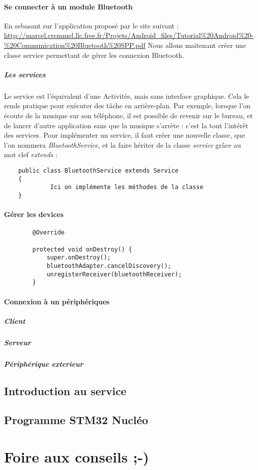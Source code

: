 \documentclass[a4paper,10pt]{article}
\begin{document}
	
	\paragraph{Se connecter à un module Bluetooth}
	
	En sebasant sur l'application proposé par le site suivant : \\
	\url{http://marcel.cremmel.llc.free.fr/Projets/Android_files/Tutorial%20Android%20-%20Communication%20Bluetooth%20SPP.pdf}
	Nous allons maitenant créer une classe service permettant de gérer les connexion Bluetooth.
	\subparagraph{Les services}
	Le service est l'équivalent d'une Activités, mais sans interface graphique. Cela le rends pratique pour exécuter des tâche en arrière-plan. Par exemple, lorsque l'on écoute de la musique sur son téléphone, il est possible de revenir sur le bureau, et de lancer d'autre application sans que la musique s'arrète : c'est la tout l'intérêt des services.
	Pour implémenter un service, il faut créer une nouvelle classe, que l'on nommera \textit{BluetoothService}, et la faire hériter de la classe \textit{service} grâce au mot clef \textit{extends} :
	\begin{lstlisting}
	public class BluetoothService extends Service
	{
			 Ici on implémente les méthodes de la classe
	}
	\end{lstlisting}
	
	
	\paragraph{Gérer les devices}
	\begin{lstlisting}
		@Override
 
		protected void onDestroy() {
  			super.onDestroy();
  			bluetoothAdapter.cancelDiscovery();
  			unregisterReceiver(bluetoothReceiver);
		}
	\end{lstlisting}
	\paragraph{Connexion à un périphériques}
	
	\subparagraph{Client}
	
	\subparagraph{Serveur}
	
	\subparagraph{Périphérique exterieur}
	

\subsection{Introduction au service}
\subsection{Programme STM32 Nucléo}


\section{Foire aux conseils ;-)}
\end{document}
